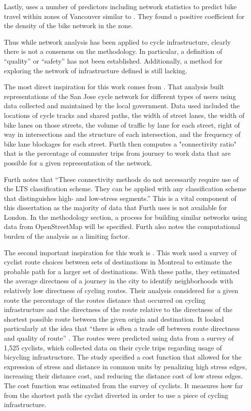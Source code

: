 Lastly, \textcite{osama2017models} uses a number of predictors including network statistics to predict bike travel within zones of Vancouver similar to \textcite{schoner2014missing}. They found a positive coefficient for the density of the bike network in the zone. 

Thus while network analysis has been applied to cycle infrastructure, clearly there is not a consensus on the methodology. In particular, a definition of ``quality'' or ``safety'' has not been established. Additionally, a method for exploring the network of infrastructure defined is still lacking. 

The most direct inspiration for this work comes from \textcite{furth2016network}. That analysis built representations of the San Jose cycle network for different types of users using data collected and maintained by the local government. Data used included the locations of cycle tracks and shared paths, the width of street lanes, the width of bike lanes on those streets,  the volume of traffic by lane for each street, right of way in intersections and the structure of each intersection, and the frequency of bike lane blockages for each street. Furth then computes a "connectivity ratio" that is the percentage of commuter trips from journey to work data that are possible for a given representation of the network. 

Furth notes that ``These connectivity methods do not necessarily require use of the LTS classification scheme. They can be applied with any classification scheme that distinguishes high- and low-stress segments.'' This is a vital component of this dissertation as the majority of data that Furth uses is not available for London. In the methodology section, a process for building similar networks using data from OpenStreetMap will be specified. Furth also notes the computational burden of the analysis as a limiting factor. 

The second important inspiration for this work is \textcite{boisjoly2019bicycle}. This work used a survey of cyclist route choices between sets of destinations in Montreal to estimate the probable path for a larger set of destinations. With these paths, they estimated the average directness of a journey in the city to identify neighborhoods with relatively low directness of cycling routes.  Their analysis considered for a given route the percentage of the routes distance that occurred on cycling infrastructure and the directness of the route relative to the directness of the shortest possible route between the given origin and destination. It looked particularly at the idea that ``there is often a trade off between route directness and quality of route'' \parencite{boisjoly2019bicycle}.  The routes were predicted using data from a survey of 1,525 cyclists, which collected data on their cycle trips regarding usage of bicycling infrastructure. The study specified a cost function that allowed for the expression of stress and distance in common units by penalizing high stress edges, increasing their distance cost, and reducing the distance cost of low stress edges. The cost function was estimated from the survey of cyclists. It measures how far from the shortest path the cyclist diverted in order to use a piece of cycling infrastructure. 

